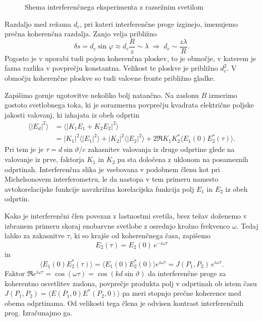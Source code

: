 \begin{figure}[h]
\centering
\def\svgwidth{140truemm} 

\caption{Shema interferenčnega eksperimenta z razsežnim svetilom}
\label{fig:shema-interferenca}
\end{figure}

Razdaljo med režama $d_c$, pri kateri interferenčne proge
izginejo, imenujemo prečna koherenčna razdalja. 
Zanjo velja približno 
\begin{equation}
\delta s = d_c\sin\varphi\approx d_c\frac{R}{z}\sim\lambda\;\Rightarrow\;
d_{c}\sim\frac{z\lambda}{R}.
\label{eq:prost_koh}
\end{equation}
Pogosto je v uporabi
tudi pojem koherenčna ploskev, to je območje, 
v katerem je fazna razlika v povprečju konstantna. Velikost te ploskve je približno $d_{c}^{2}$.
V območju koherenčne ploskve so tudi valovne fronte približno gladke.

Zapišimo gornje ugotovitve nekoliko bolj natančno. Na zaslonu $B$
izmerimo gostoto svetlobnega toka, ki je sorazmerna povprečju kvadrata
električne poljske jakosti valovanj, ki izhajata iz obeh odprtin
\begin{align}
\langle|E{}_{d}|^{2}\rangle & =\langle|K_{1}E_{1}+K_{2}E_{2}|^{2}\rangle\nonumber \\
&=  |K_{1}|^{2}\langle|E_{1}|^{2}\rangle+|K_{2}|^{2}\langle|E_{2}|^{2}\rangle+
2\Re K_{1}K_{2}^{*}\langle E_{1}(0)E_{2}^{*}(\tau)\rangle.
\end{align}
Pri tem je je $\tau=d\sin\vartheta/c$ zakasnitev valovanja iz druge odprtine
glede na valovanje iz prve, faktorja $K_{1}$ in $K_{2}$ pa sta določena
z uklonom na posameznih odprtinah.
Interferenčna slika je vsebovana v podobnem členu kot pri Michelsonovem
interferometru, le da nastopa v tem primeru namesto avtokorelacijske funkcije
navzkrižna korelacijska funkcija polj $E_{1}$ in $E_{2}$ iz obeh
odprtin. 

Kako je interferenčni člen povezan z lastnostmi svetila, brez težav
doženemo v izbranem primeru skoraj enobarvne svetlobe z osrednjo krožno frekvenco
$\omega$. Tedaj lahko za zakasnitve $\tau$, ki so krajše
od koherenčnega časa, zapišemo 
\begin{equation}
E_{2}(\tau)=E_{2}(0)\, e^{-i\omega\tau}
\end{equation}
 in 
\begin{equation}
\langle E_{1}(0)E_{2}^{*}(\tau)\rangle=\langle E_{1}(0)E_{2}^{*}(0)\rangle 
e^{i\omega\tau}=J(P_{1},P_{2})\, e^{i\omega\tau}.
\end{equation}
Faktor $\Re e^{i\omega\tau}= \cos(\omega \tau) = \cos(kd\sin\vartheta)$ da interferenčne
proge za koherentno osvetlitev zaslona, povprečje produkta polj
v odprtinah ob istem času $J(P_{1},P_{2})=\langle E(P_{1},0)E^{*}(P_{2},0)\rangle$
pa meri stopnjo prečne koherence med obema odprtinama. Od velikosti
tega člena je odvisen kontrast interferenčnih prog. Izračunajmo ga.


